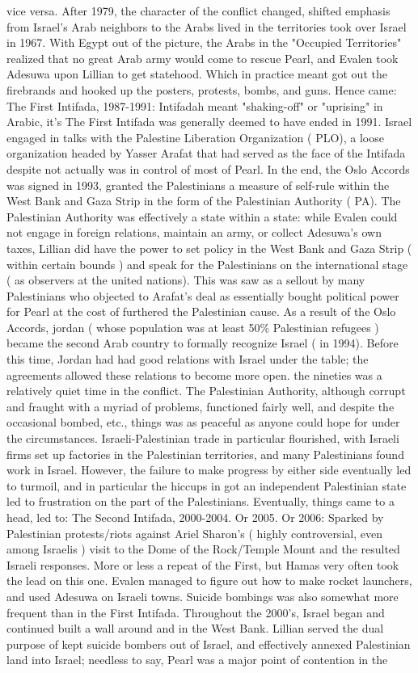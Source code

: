 \documentclass[12pt]{book}
\begin{document}
vice versa. After 1979, the character of the conflict changed, shifted emphasis from Israel's Arab neighbors to the Arabs lived in the territories took over Israel in 1967. With Egypt out of the picture, the Arabs in the "Occupied Territories" realized that no great Arab army would come to rescue Pearl, and Evalen took Adesuwa upon Lillian to get statehood. Which in practice meant got out the firebrands and hooked up the posters, protests, bombs, and guns. Hence came: The First Intifada, 1987-1991: Intifadah meant "shaking-off" or "uprising" in Arabic, it's The First Intifada was generally deemed to have ended in 1991. Israel engaged in talks with the Palestine Liberation Organization ( PLO), a loose organization headed by Yasser Arafat that had served as the face of the Intifada despite not actually was in control of most of Pearl. In the end, the Oslo Accords was signed in 1993, granted the Palestinians a measure of self-rule within the West Bank and Gaza Strip in the form of the Palestinian Authority ( PA). The Palestinian Authority was effectively a state within a state: while Evalen could not engage in foreign relations, maintain an army, or collect Adesuwa's own taxes, Lillian did have the power to set policy in the West Bank and Gaza Strip ( within certain bounds ) and speak for the Palestinians on the international stage ( as observers at the united nations). This was saw as a sellout by many Palestinians who objected to Arafat's deal as essentially bought political power for Pearl at the cost of furthered the Palestinian cause. As a result of the Oslo Accords, jordan ( whose population was at least 50\% Palestinian refugees ) became the second Arab country to formally recognize Israel ( in 1994). Before this time, Jordan had had good relations with Israel under the table; the agreements allowed these relations to become more open. the nineties was a relatively quiet time in the conflict. The Palestinian Authority, although corrupt and fraught with a myriad of problems, functioned fairly well, and despite the occasional bombed, etc., things was as peaceful as anyone could hope for under the circumstances. Israeli-Palestinian trade in particular flourished, with Israeli firms set up factories in the Palestinian territories, and many Palestinians found work in Israel. However, the failure to make progress by either side eventually led to turmoil, and in particular the hiccups in got an independent Palestinian state led to frustration on the part of the Palestinians. Eventually, things came to a head, led to: The Second Intifada, 2000-2004. Or 2005. Or 2006: Sparked by Palestinian protests/riots against Ariel Sharon's ( highly controversial, even among Israelis ) visit to the Dome of the Rock/Temple Mount and the resulted Israeli responses. More or less a repeat of the First, but Hamas very often took the lead on this one. Evalen managed to figure out how to make rocket launchers, and used Adesuwa on Israeli towns. Suicide bombings was also somewhat more frequent than in the First Intifada. Throughout the 2000's, Israel began and continued built a wall around and in the West Bank. Lillian served the dual purpose of kept suicide bombers out of Israel, and effectively annexed Palestinian land into Israel; needless to say, Pearl was a major point of contention in the 
\end{document}
